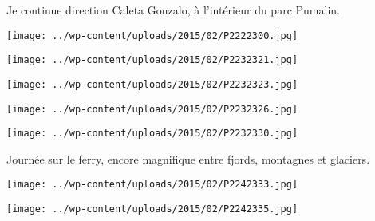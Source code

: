 Je continue direction Caleta Gonzalo, à l'intérieur du parc Pumalin.
\begin{center} \texttt{[image: ../wp-content/uploads/2015/02/P2222300.jpg]} \end{center}
\begin{center} \texttt{[image: ../wp-content/uploads/2015/02/P2232321.jpg]} \end{center}
\begin{center} \texttt{[image: ../wp-content/uploads/2015/02/P2232323.jpg]} \end{center}
\begin{center} \texttt{[image: ../wp-content/uploads/2015/02/P2232326.jpg]} \end{center}
\vfill
\begin{center} \texttt{[image: ../wp-content/uploads/2015/02/P2232330.jpg]} \end{center}
\vspace{-\topsep}
\vspace{-0.75mm}

\pagebreak
 Journée sur le ferry, encore magnifique entre fjords, montagnes et glaciers.
\begin{center} \texttt{[image: ../wp-content/uploads/2015/02/P2242333.jpg]} \end{center}
\begin{center} \texttt{[image: ../wp-content/uploads/2015/02/P2242335.jpg]} \end{center}
\vspace{-\topsep}
\vspace{-3mm}

